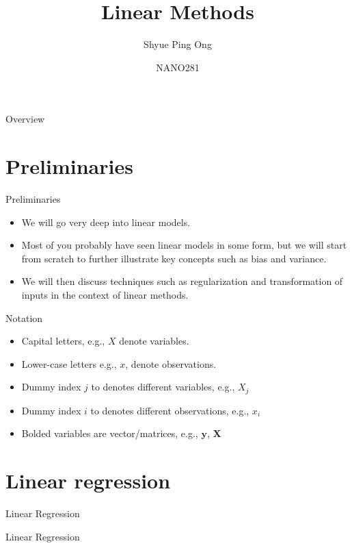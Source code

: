 \documentclass{beamer}
\title[Linear Methods]{Linear Methods}
\author{Shyue Ping Ong}
\institute[UCSD]{University of California, San Diego\\
\medskip
}
\date{NANO281}
\let \vec \mathbf
\begin{document}
\begin{frame}
    \titlepage %
\end{frame}


\begin{frame}{Overview}
    \tableofcontents
\end{frame}


\section{Preliminaries}

\begin{frame}{Preliminaries}
    \begin{itemize}
        \item We will go very deep into linear models.
        \item Most of you probably have seen linear models in some form, but we will start from scratch to further illustrate key concepts such as bias and variance.
        \item We will then discuss techniques such as regularization and transformation of inputs in the context of linear methods.
    \end{itemize}
\end{frame}

\begin{frame}{Notation}
    \begin{itemize}
        \item Capital letters, e.g., $X$ denote variables.
        \item Lower-case letters e.g., $x$, denote observations.
        \item Dummy index $j$ to denotes different variables, e.g., $X_j$
        \item Dummy index $i$ to denotes different observations, e.g., $x_i$
        \item Bolded variables are vector/matrices, e.g., $\vec{y}$, $\vec{X}$
    \end{itemize}
\end{frame}

\section{Linear regression}

\begin{frame}{Linear Regression}
    \Huge{\centerline{Linear Regression}}
\end{frame} 
\end{document}
